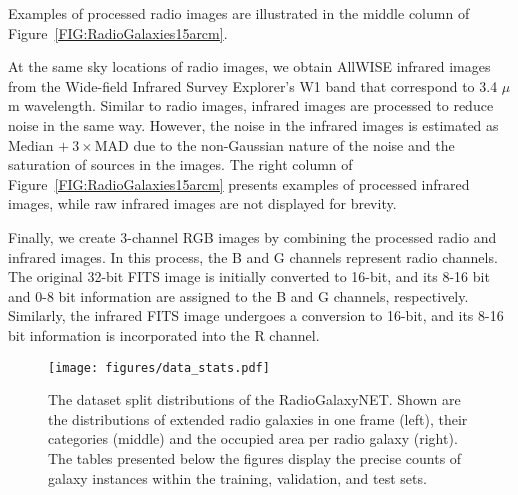 \documentclass[
  journal=pasa,
  manuscript=research-paper, %
  year=2020,
  volume=37,
]{cup-journal}
\begin{document}
Examples of processed radio images are illustrated in the middle column of Figure~\ref{FIG:RadioGalaxies15arcm}. 

At the same sky locations of radio images, we obtain AllWISE \citep[][]{cutri13} infrared images from the Wide-field Infrared Survey Explorer's \citep[WISE;][]{wright10} W1 band that correspond to 3.4 $\mu$m wavelength.
Similar to radio images, infrared images are processed to reduce noise in the same way. 
However, the noise in the infrared images is estimated as Median $+~3\times$MAD due to the non-Gaussian nature of the noise and the saturation of sources in the images.
The right column of Figure~\ref{FIG:RadioGalaxies15arcm} presents examples of processed infrared images, while raw infrared images are not displayed for brevity.

Finally, we create 3-channel RGB images by combining the processed radio and infrared images.
In this process, the B and G channels represent radio channels. 
The original 32-bit FITS image is initially converted to 16-bit, and its 8-16 bit and 0-8 bit information are assigned to the B and G channels, respectively. 
Similarly, the infrared FITS image undergoes a conversion to 16-bit, and its 8-16 bit information is incorporated into the R channel.

\begin{figure*}
\centering
\texttt{[image: figures/data\_stats.pdf]}
\caption{The dataset split distributions of the RadioGalaxyNET. Shown are the distributions of extended radio galaxies in one frame (left), their categories (middle) and the occupied area per radio galaxy (right). The tables presented below the figures display the precise counts of galaxy instances within the training, validation, and test sets.}
\label{FIG:Statistics}
\end{figure*}
\end{document}
